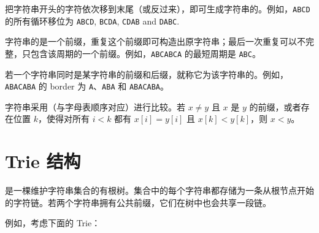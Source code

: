 
把字符串开头的字符依次移到末尾（或反过来），即可生成字符串的。例如，\texttt{ABCD} 的所有循环移位为
\texttt{ABCD}, \texttt{BCDA}, \texttt{CDAB} and \texttt{DABC}.


字符串的是一个前缀，重复这个前缀即可构造出原字符串；最后一次重复可以不完整，只包含该周期的一个前缀。例如，\texttt{ABCABCA} 的最短周期是 \texttt{ABC}。


若一个字符串同时是某字符串的前缀和后缀，就称它为该字符串的。例如，\texttt{ABACABA} 的 border 为 \texttt{A}、\texttt{ABA} 和 \texttt{ABACABA}。


字符串采用（与字母表顺序对应）进行比较。若 $x \neq y$ 且 $x$ 是 $y$ 的前缀，或者存在位置 $k$，使得对所有 $i<k$ 都有 $x[i]=y[i]$ 且 $x[k]<y[k]$，则 $x<y$。

\section{Trie 结构}


是一棵维护字符串集合的有根树。集合中的每个字符串都存储为一条从根节点开始的字符链。若两个字符串拥有公共前缀，它们在树中也会共享一段链。

例如，考虑下面的 Trie：

